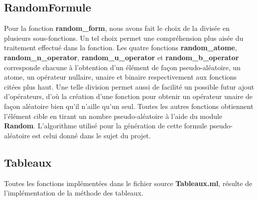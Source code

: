 \documentclass[12pt]{article}
\begin{document}
    \subsection{RandomFormule}

    Pour la fonction \textbf{random\_form}, nous avons fait le choix de la divisée en 
    plusieurs sous-fonctions. Un tel choix permet une compréhension plus
    aisée du traitement effectué dans la fonction. Les quatre fonctions 
    \textbf{random\_atome}, \textbf{random\_n\_operator}, 
    \textbf{random\_u\_operator} et \textbf{random\_b\_operator} corresponde 
    chacune à l'obtention d'un élément de façon pseudo-aléatoire, un atome, un 
    opérateur nullaire, unaire et binaire respectivement aux fonctions citées plus 
    haut. Une telle division permet aussi de facilité un possible futur ajout 
    d'opérateurs, d'où la création d'une fonction pour obtenir un opérateur 
    unaire de façon aléatoire bien qu'il n'aille qu'un seul. Toutes les autres 
    fonctions obtiennent l'élément cible en tirant un nombre pseudo-aléatoire à 
    l'aide du module \textbf{Random}. L'algorithme utilisé pour la génération de 
    cette formule pseudo-aléatoire est celui donné dans le sujet du projet.

    \subsection{Tableaux}

    Toutes les fonctions implémentées dans le fichier source \textbf{Tableaux.ml}, 
    résulte de l'implémentation de la méthode des tableaux.   

    \vphantom{}
\end{document}
